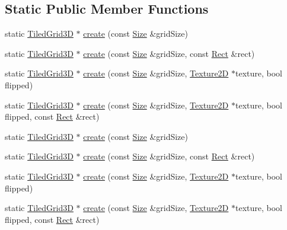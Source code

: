 \subsection*{Static Public Member Functions}
\begin{DoxyCompactItemize}
\item 
static \hyperlink{classTiledGrid3D}{Tiled\+Grid3D} $\ast$ \hyperlink{classTiledGrid3D_aa4c025a43abe6289034faead66a716c8}{create} (const \hyperlink{classSize}{Size} \&grid\+Size)
\item 
static \hyperlink{classTiledGrid3D}{Tiled\+Grid3D} $\ast$ \hyperlink{classTiledGrid3D_aa5e8fb9cda28df06209047b216191397}{create} (const \hyperlink{classSize}{Size} \&grid\+Size, const \hyperlink{classRect}{Rect} \&rect)
\item 
static \hyperlink{classTiledGrid3D}{Tiled\+Grid3D} $\ast$ \hyperlink{classTiledGrid3D_af0c43e7194a4f39bb81437f71c54827a}{create} (const \hyperlink{classSize}{Size} \&grid\+Size, \hyperlink{classTexture2D}{Texture2D} $\ast$texture, bool flipped)
\item 
static \hyperlink{classTiledGrid3D}{Tiled\+Grid3D} $\ast$ \hyperlink{classTiledGrid3D_a2e77dedb106db1ae6ea0cf8ecd55c5a6}{create} (const \hyperlink{classSize}{Size} \&grid\+Size, \hyperlink{classTexture2D}{Texture2D} $\ast$texture, bool flipped, const \hyperlink{classRect}{Rect} \&rect)
\item 
static \hyperlink{classTiledGrid3D}{Tiled\+Grid3D} $\ast$ \hyperlink{classTiledGrid3D_a696e6e1d963c1fe3ca950bf195a77090}{create} (const \hyperlink{classSize}{Size} \&grid\+Size)
\item 
static \hyperlink{classTiledGrid3D}{Tiled\+Grid3D} $\ast$ \hyperlink{classTiledGrid3D_ad97376762244c6f7cacfa14917654033}{create} (const \hyperlink{classSize}{Size} \&grid\+Size, const \hyperlink{classRect}{Rect} \&rect)
\item 
static \hyperlink{classTiledGrid3D}{Tiled\+Grid3D} $\ast$ \hyperlink{classTiledGrid3D_a67d793707c95274ed22b566ebd9fdbf5}{create} (const \hyperlink{classSize}{Size} \&grid\+Size, \hyperlink{classTexture2D}{Texture2D} $\ast$texture, bool flipped)
\item 
static \hyperlink{classTiledGrid3D}{Tiled\+Grid3D} $\ast$ \hyperlink{classTiledGrid3D_a8261d121e2ed19042ee6672285c94491}{create} (const \hyperlink{classSize}{Size} \&grid\+Size, \hyperlink{classTexture2D}{Texture2D} $\ast$texture, bool flipped, const \hyperlink{classRect}{Rect} \&rect)
\end{DoxyCompactItemize}
